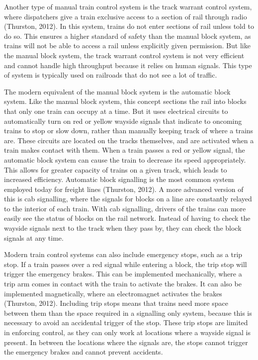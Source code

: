 \documentclass[11pt, titlepage]{article}
\begin{document}
Another type of manual train control system is the track warrant control system, where dispatchers give a train exclusive access to a section of rail through radio (Thurston, 2012). In this system, trains do not enter sections of rail unless told to do so. This ensures a higher standard of safety than the manual block system, as trains will not be able to access a rail unless explicitly given permission. But like the manual block system, the track warrant control system is not very efficient and cannot handle high throughput because it relies on human signals. This type of system is typically used on railroads that do not see a lot of traffic.

The modern equivalent of the manual block system is the automatic block system. Like the manual block system, this concept sections the rail into blocks that only one train can occupy at a time. But it uses electrical circuits to automatically turn on red or yellow wayside signals that indicate to oncoming trains to stop or slow down, rather than manually keeping track of where a trains are. These circuits are located on the tracks themselves, and are activated when a train makes contact with them. When a train passes a red or yellow signal, the automatic block system can cause the train to decrease its speed appropriately. This allows for greater capacity of trains on a given track, which leads to increased efficiency. Automatic block signalling is the most common system employed today for freight lines (Thurston, 2012). A more advanced version of this is cab signalling, where the signals for blocks on a line are constantly relayed to the interior of each train. With cab signalling, drivers of the trains can more easily see the status of blocks on the rail network. Instead of having to check the wayside signals next to the track when they pass by, they can check the block signals at any time.

Modern train control systems can also include emergency stops, such as a trip stop. If a train passes over a red signal while entering a block, the trip stop will trigger the emergency brakes. This can be implemented mechanically, where a trip arm comes in contact with the train to activate the brakes. It can also be implemented magnetically, where an electromagnet activates the brakes (Thurston, 2012). Including trip stops means that trains need more space between them than the space required in a signalling only system, because this is necessary to avoid an accidental trigger of the stop. These trip stops are limited in enforcing control, as they can only work at locations where a wayside signal is present. In between the locations where the signals are, the stops cannot trigger the emergency brakes and cannot prevent accidents.
\end{document}
